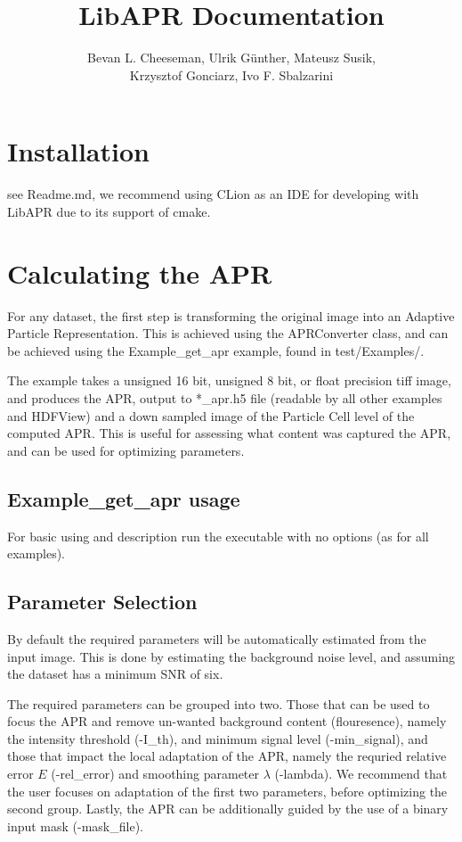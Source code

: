 \documentclass[12pt]{article}
\title{LibAPR Documentation}
\author
{Bevan L. Cheeseman, Ulrik G{\"u}nther, Mateusz Susik,\\ Krzysztof Gonciarz, Ivo F. Sbalzarini}
\begin{document}
\maketitle

\section{Installation}
see Readme.md, we recommend using CLion as an IDE for developing with LibAPR due to its support of cmake.
\section{Calculating the APR}
For any dataset, the first step is transforming the original image into an Adaptive Particle Representation. This is achieved using the APRConverter class, and can be achieved using the Example\_get\_apr example, found in test/Examples/.

The example takes a unsigned 16 bit, unsigned 8 bit, or float precision tiff image, and produces the APR, output to  *\_apr.h5 file (readable by all other examples and HDFView) and a down sampled image of the Particle Cell level of the computed APR. This is useful for assessing what content was captured the APR, and can be used for optimizing parameters.
\subsection{Example\_get\_apr usage}
For basic using and description run the executable with no options (as for all examples).
\subsection{Parameter Selection}
By default the required parameters will be automatically estimated from the input image. This is done by estimating the background noise level, and assuming the dataset has a minimum SNR of six. 

The required parameters can be grouped into two. Those that can be used to focus the APR and remove un-wanted background content (flouresence), namely the intensity threshold (-I\_th), and minimum signal level (-min\_signal), and those that impact the local adaptation of the APR, namely the requried relative error $E$ (-rel\_error) and smoothing parameter $\lambda$ (-lambda). We recommend that the user focuses on adaptation of the first two parameters, before optimizing the second group. Lastly, the APR can be additionally guided by the use of a binary input mask (-mask\_file).
\end{document}
